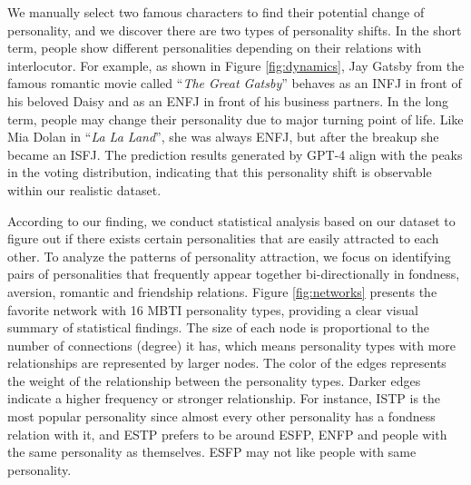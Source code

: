 We manually select two famous characters to find their potential change of personality, and we discover there are two types of personality shifts. In the short term, people show different personalities depending on their relations with interlocutor. For example, as shown in Figure \ref{fig:dynamics}, Jay Gatsby from the famous romantic movie called ``\textit{The Great Gatsby}'' behaves as an INFJ in front of his beloved Daisy and as an ENFJ in front of his business partners. In the long term, people may change their personality due to major turning point of life. Like Mia Dolan in ``\textit{La La Land}'', she was always ENFJ, but after the breakup she became an ISFJ. The prediction results generated by GPT-4 align with the peaks in the voting distribution, indicating that this personality shift is observable within our realistic dataset.

According to our finding, we conduct statistical analysis based on our dataset to figure out if there exists certain personalities that are easily attracted to each other. To analyze the patterns of personality attraction, we focus on identifying pairs of personalities that frequently appear together bi-directionally in fondness, aversion, romantic and friendship relations. Figure \ref{fig:networks} presents the favorite network with 16 MBTI personality types, providing a clear visual summary of statistical findings. The size of each node is proportional to the number of connections (degree) it has, which means personality types with more relationships are represented by larger nodes. The color of the edges represents the weight of the relationship between the personality types. Darker edges indicate a higher frequency or stronger relationship. 
For instance, ISTP is the most popular personality since almost every other personality has a fondness relation with it, and ESTP prefers to be around ESFP, ENFP and people with the same personality as themselves. ESFP may not like people with same personality.



